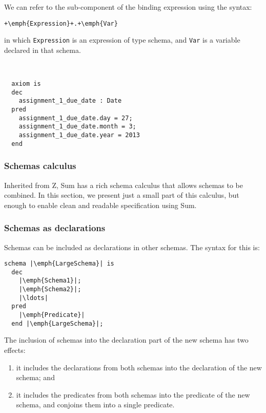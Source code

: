 We can refer to the sub-component of the binding expression using the syntax:


\lstset{aboveskip=3mm}
\begin{lstlisting}[escapeinside={++}]
  +\emph{Expression}+.+\emph{Var}
\end{lstlisting}

in which \texttt{Expression} is an expression of type schema, and \texttt{Var} is a variable declared in that schema.

\begin{example}
~

\lstset{aboveskip=3mm}
\begin{lstlisting}
  axiom is
  dec
    assignment_1_due_date : Date
  pred
    assignment_1_due_date.day = 27;
    assignment_1_due_date.month = 3;
    assignment_1_due_date.year = 2013
  end
\end{lstlisting}

\end{example}

\subsubsection{Schemas calculus}
\label{sec:specification:sum:schema-calculus}

Inherited from Z, Sum has a rich schema calculus that allows schemas to be combined. In this section, we present just a small part of this calculus, but enough to enable clean and readable specification using Sum.

\subsubsection*{Schemas as declarations}

Schemas can be included as declarations in other schemas. The syntax for this is:

\lstset{aboveskip=3mm}
\begin{lstlisting}[escapeinside={||}]
  schema |\emph{LargeSchema}| is
  dec
    |\emph{Schema1}|;
    |\emph{Schema2}|;
    |\ldots|
  pred
    |\emph{Predicate}|
  end |\emph{LargeSchema}|;
\end{lstlisting}

The inclusion of schemas into the declaration part of the new schema has two effects:

\begin{enumerate}
  \item it includes the declarations from both schemas into the declaration of the new schema; and
  \item it includes the predicates from both schemas into the predicate of the new schema, and conjoins them into a single predicate.
\end{enumerate}

